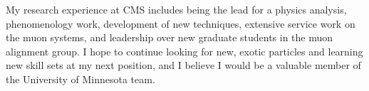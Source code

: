 \documentclass[11pt]{article}
\begin{document}






\bigskip

My research experience at CMS includes being the lead for a physics analysis, phenomenology work, development of new techniques, extensive service work on the muon systems, and 
leadership over new graduate students in the muon alignment group. I hope to continue looking for new, exotic particles and learning new skill sets at my next position, and I believe I would be a valuable member of the University of Minnesota team. 
\end{document}
